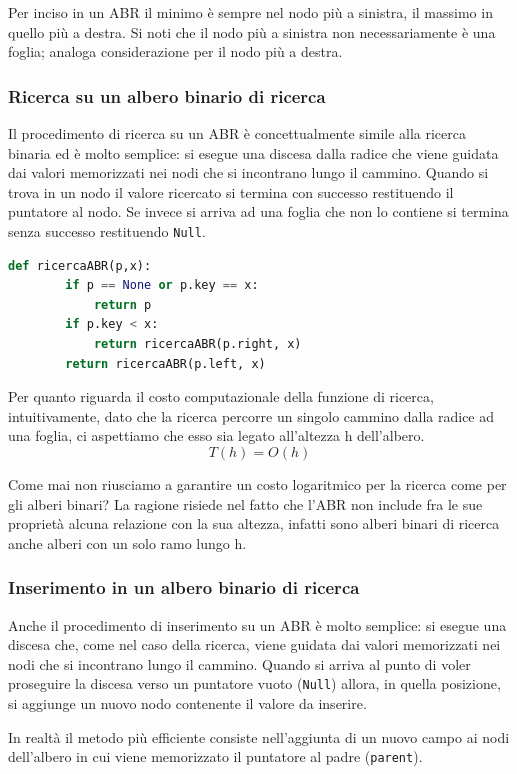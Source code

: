 Per inciso in un ABR il minimo è sempre nel nodo più a sinistra, il massimo in quello più a destra. Si noti che il nodo più a sinistra non necessariamente è una foglia; analoga considerazione per il nodo più a destra.

\subsubsection{Ricerca su un albero binario di ricerca}
Il procedimento di ricerca su un ABR è concettualmente simile alla ricerca binaria ed è molto semplice: si esegue una discesa dalla radice che viene guidata dai valori memorizzati nei nodi che si incontrano lungo il cammino. Quando si trova in un nodo il valore ricercato si termina con successo restituendo il puntatore al nodo. Se invece si arriva ad una foglia che non lo contiene si termina senza successo restituendo \verb|Null|.
\begin{lstlisting}[language=Python]
    def ricercaABR(p,x):
        if p == None or p.key == x:
            return p
        if p.key < x:
            return ricercaABR(p.right, x)
        return ricercaABR(p.left, x)
\end{lstlisting}
Per quanto riguarda il costo computazionale della funzione di ricerca, intuitivamente, dato che la ricerca percorre un singolo cammino dalla radice ad una foglia, ci aspettiamo che esso sia legato all’altezza h dell'albero.
\begin{equation*}
    T(h)=O(h)
\end{equation*}

Come mai non riusciamo a garantire un costo logaritmico per la ricerca come per gli alberi binari? La ragione risiede nel fatto che l'ABR non include fra le sue proprietà alcuna relazione con la sua altezza, infatti sono alberi binari di ricerca anche alberi con un solo ramo lungo h.

\subsubsection{Inserimento in un albero binario di ricerca}
Anche il procedimento di inserimento su un ABR è molto semplice: si esegue una discesa che, come nel caso della ricerca, viene guidata dai valori memorizzati nei nodi che si incontrano lungo il cammino. Quando si arriva al punto di voler proseguire la discesa verso un puntatore vuoto (\verb|Null|) allora, in quella posizione, si aggiunge un nuovo nodo contenente il valore da inserire.

In realtà il metodo più efficiente consiste nell'aggiunta di un nuovo campo ai nodi dell'albero in cui viene memorizzato il puntatore al padre (\verb|parent|).


